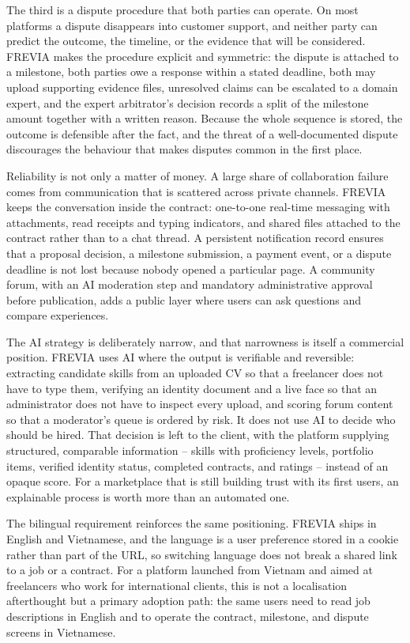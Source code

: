 The third is a dispute procedure that both parties can operate. On most platforms a dispute disappears into customer support, and neither party can predict the outcome, the timeline, or the evidence that will be considered. FREVIA makes the procedure explicit and symmetric: the dispute is attached to a milestone, both parties owe a response within a stated deadline, both may upload supporting evidence files, unresolved claims can be escalated to a domain expert, and the expert arbitrator's decision records a split of the milestone amount together with a written reason. Because the whole sequence is stored, the outcome is defensible after the fact, and the threat of a well-documented dispute discourages the behaviour that makes disputes common in the first place.

Reliability is not only a matter of money. A large share of collaboration failure comes from communication that is scattered across private channels. FREVIA keeps the conversation inside the contract: one-to-one real-time messaging with attachments, read receipts and typing indicators, and shared files attached to the contract rather than to a chat thread. A persistent notification record ensures that a proposal decision, a milestone submission, a payment event, or a dispute deadline is not lost because nobody opened a particular page. A community forum, with an AI moderation step and mandatory administrative approval before publication, adds a public layer where users can ask questions and compare experiences.

The AI strategy is deliberately narrow, and that narrowness is itself a commercial position. FREVIA uses AI where the output is verifiable and reversible: extracting candidate skills from an uploaded CV so that a freelancer does not have to type them, verifying an identity document and a live face so that an administrator does not have to inspect every upload, and scoring forum content so that a moderator's queue is ordered by risk. It does not use AI to decide who should be hired. That decision is left to the client, with the platform supplying structured, comparable information -- skills with proficiency levels, portfolio items, verified identity status, completed contracts, and ratings -- instead of an opaque score. For a marketplace that is still building trust with its first users, an explainable process is worth more than an automated one.

The bilingual requirement reinforces the same positioning. FREVIA ships in English and Vietnamese, and the language is a user preference stored in a cookie rather than part of the URL, so switching language does not break a shared link to a job or a contract. For a platform launched from Vietnam and aimed at freelancers who work for international clients, this is not a localisation afterthought but a primary adoption path: the same users need to read job descriptions in English and to operate the contract, milestone, and dispute screens in Vietnamese.

